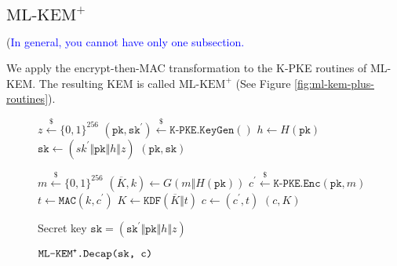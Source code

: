 \documentclass[journal=tches,submission]{iacrtrans}
\newcommand{\keygen}{\texttt{KeyGen}}
\newcommand{\encrypt}{\texttt{Enc}}
\newcommand{\encap}{\texttt{Encap}}
\newcommand{\decap}{\texttt{Decap}}
\newcommand{\mac}{\texttt{MAC}}
\newcommand{\pk}{\texttt{pk}}
\newcommand{\sk}{\texttt{sk}}
\newcommand{\leftsample}{\stackrel{\$}{\leftarrow}}
\def\mlkemplus{\text{ML-KEM}^+}
\begin{document}
\subsection{$\mlkemplus$} (\textcolor{blue}{In general, you cannot have only one subsection.}

We apply the encrypt-then-MAC transformation to the K-PKE routines of ML-KEM. The resulting KEM is called $\mlkemplus$ (See Figure \ref{fig:ml-kem-plus-routines}).

\begin{figure}[h]
    \centering

    \begin{minipage}[t]{0.5\textwidth}
        \begin{algorithm}[H]
            \caption*{$\texttt{ML-KEM}^\texttt{+}\texttt{.}\keygen\texttt{()}$}
            \begin{algorithmic}[1]
                \State $z \leftsample \{0,1\}^{256}$
                \State $(\pk, \sk^\prime) \leftsample \texttt{K-PKE}.\keygen()$
                \State $h \leftarrow H(\pk)$
                \State $\sk \leftarrow (sk^\prime \Vert \pk \Vert h \Vert z)$
                \State \Return $(\pk, \sk)$
            \end{algorithmic}
        \end{algorithm}\vspace{-0.5cm}
        \begin{algorithm}[H]
            \caption*{$\texttt{ML-KEM}^\texttt{+}\texttt{.}\encap\texttt{(\pk)}$}
            \begin{algorithmic}[1]
                \State $m \leftsample \{0,1\}^{256}$
                \State $(\overline{K}, k) \leftarrow G(m \Vert H(\pk))$
                \State $c^\prime \leftsample \texttt{K-PKE}.\encrypt(\pk, m)$
                \State $t \leftarrow \mac(k, c^\prime)$
                \State $K \leftarrow \texttt{KDF}(\overline{K} \Vert t)$
                \State $c \leftarrow (c^\prime, t)$
                \State \Return $(c, K)$
            \end{algorithmic}
        \end{algorithm}
    \end{minipage}\hfill
    \begin{minipage}[t]{0.49\textwidth}
        \begin{algorithm}[H]
            \caption*{$\texttt{ML-KEM}^\texttt{+}\texttt{.}\decap\texttt{(\sk, c)}$}
            \begin{algorithmic}[1]
                \Require Secret key $\sk = (\sk^\prime \Vert \pk \Vert h \Vert z)$

\end{algorithmic}
\end{algorithm}
\end{minipage}
\end{figure}
\end{document}
